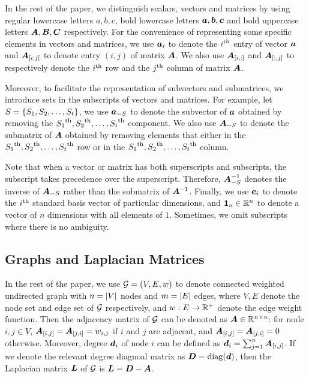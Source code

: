 \documentclass[sigconf]{acmart}
\begin{document}
In the rest of the paper, we distinguish scalars, vectors and matrices by using regular lowercase letters \(a,b,c\), bold lowercase letters \(\boldsymbol{a},\boldsymbol{b},\boldsymbol{c}\) and bold uppercase letters \(\boldsymbol{A},\boldsymbol{B},\boldsymbol{C}\) respectively.
For the convenience of representing some specific elements in vectors and matrices, we use \(\boldsymbol{a}_{i}\) to denote the \({i}^{\rm{th}}\) entry of vector \(\boldsymbol{a}\) and \(\boldsymbol{A}_{[i,j]}\) to denote entry \((i,j)\) of matrix \(\boldsymbol{A}\).
We also use \(\boldsymbol{A}_{[i,:]}\) and \(\boldsymbol{A}_{[:,j]}\) to respectively denote the \({i}^{\rm{th}}\) row and the \({j}^{\rm{th}}\) column of matrix \(\boldsymbol{A}\).

Moreover, to facilitate the representation of subvectors and submatrices, we introduce sets in the subscripts of vectors and matrices.
For example, let \(S=\left\{S_1,S_2,\dots,S_t \right\}\), we use \(\boldsymbol{a}_{-S}\) to denote the subvector of \(\boldsymbol{a}\) obtained by removing the \({S_1}^{\rm{th}},{S_2}^{\rm{th}},\dots,{S_t}^{\rm{th}}\) component.
We also use \(\boldsymbol{A}_{-S}\) to denote the submatrix of \(\boldsymbol{A}\) obtained by removing elements that either in the \({S_1}^{\rm{th}},{S_2}^{\rm{th}},\dots,{S_t}^{\rm{th}}\) row or in the \({S_1}^{\rm{th}},{S_2}^{\rm{th}},\dots,{S_t}^{\rm{th}}\) column.

Note that when a vector or matrix has both superscripts and subscripts, the subscript takes precedence over the superscript.
Therefore, \(\boldsymbol{A}_{-S}^{-1}\) denotes the inverse of \(\boldsymbol{A}_{-S}\) rather than the submatrix of \(\boldsymbol{A}^{-1}\). Finally, we use \(\boldsymbol{e}_i\) to denote the \({i}^{\rm{th}}\) standard basis vector of particular dimensions, and \(\boldsymbol{1}_n\in \mathbb{R}^n\) to denote a vector of \(n\) dimensions with all elements of \(1\). Sometimes, we omit subscripts where there is no ambiguity.

\subsection{Graphs and Laplacian Matrices}

In the rest of the paper, we use \(\mathcal{G}=(V,E,w)\) to denote connected weighted undirected graph with \(n=\left|V \right|\) nodes and \(m=\left|E \right|\) edges, where \(V,E\) denote the node set and edge set of \(\mathcal{G}\) respectively, and \(w:E\to\mathbb{R}^+\) denote the edge weight function.
Then the adjacency matrix of \(\mathcal{G}\) can be denoted as \(\boldsymbol{A}\in \mathbb{R}^{n\times n}\): for node \(i,j\in V\), \(\boldsymbol{A}_{[i,j]}=\boldsymbol{A}_{[j,i]}=w_{i,j}\) if \(i\) and \(j\) are adjacent, and \(\boldsymbol{A}_{[i,j]}=\boldsymbol{A}_{[j,i]}=0\) otherwise.
Moreover, degree \(\boldsymbol{d}_i\) of node \(i\) can be defined as \(\boldsymbol{d}_i=\sum_{j=1}^n\boldsymbol{A}_{[i,j]}\).
If we denote the relevant degree diagnoal matrix as \(\boldsymbol{D}={\rm{diag}}(\boldsymbol{d})\), then the Laplacian matrix \(\boldsymbol{L}\) of \(\mathcal{G}\) is \(\boldsymbol{L}=\boldsymbol{D}-\boldsymbol{A}\).
\end{document}
